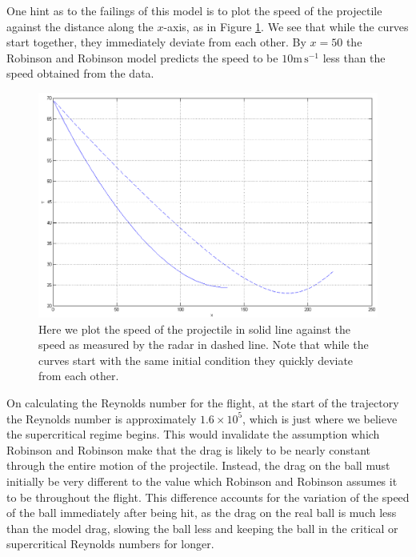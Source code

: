 One hint as to the failings of this model is to plot the speed of the projectile against
the distance along the $x$-axis, as in Figure \ref{data-rr-v}. We see that while the curves start
together, they immediately deviate from each other. By $x=50$ the Robinson and Robinson model predicts 
the speed to be $10\text{m}\,\text{s}^{-1}$ less than the speed obtained from the data.
\begin{figure}
\centering
\includegraphics[scale=0.56]{../images/data1-rr-v.png}
\caption[Plot of speed in Robinson and Robinson model against the speed in the data]{Here we plot the
speed of the projectile in solid line against the speed as measured by the radar in dashed line. Note that while
the curves start with the same initial condition they quickly deviate from each other.}
\label{data-rr-v}
\end{figure}

On calculating the Reynolds number for the flight, at the start of the trajectory the Reynolds number
is approximately $1.6\times10^5$, which is just where we believe the supercritical regime begins. This
would invalidate the assumption which Robinson and Robinson make that the drag is likely to be nearly
constant through the entire motion of the projectile. Instead, the drag on the ball must initially be
very different to the value which Robinson and Robinson assumes it to be throughout the flight. This
difference accounts for the variation of the speed of the ball immediately after being hit, as the 
drag on the real ball is much less than the model drag, slowing the ball less and keeping
the ball in the critical or supercritical Reynolds numbers for longer.


